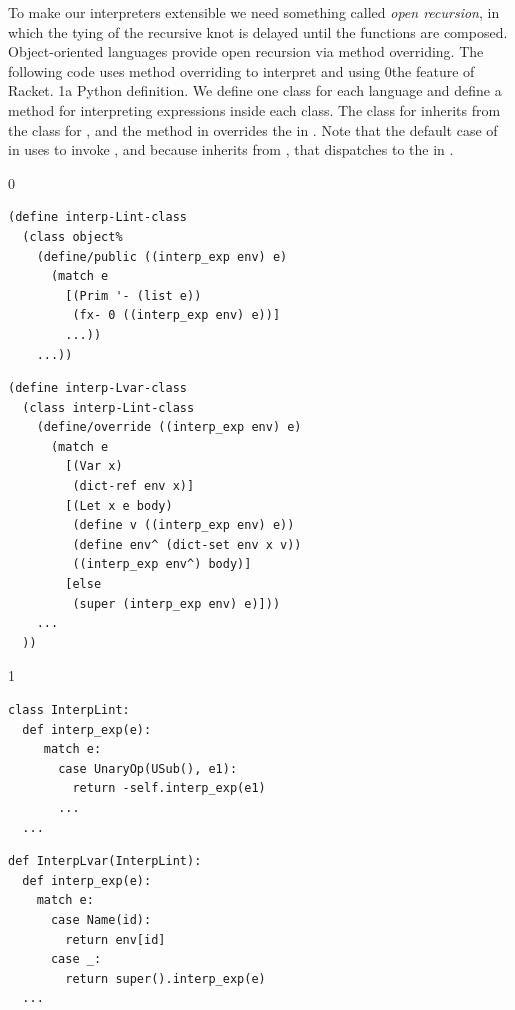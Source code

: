 \documentclass[7x10]{TimesAPriori_MIT}%
\def\racketEd{0}
\def\pythonEd{1}
\def\edition{0}
\newcommand{\racket}[1]{{\if\edition\racketEd{#1}\fi}}
\newcommand{\python}[1]{{\if\edition\pythonEd #1\fi}}
\numberwithin{theorem}{chapter}
\numberwithin{definition}{chapter}
\numberwithin{equation}{chapter}
\begin{document}
To make our interpreters extensible we need something called
\emph{open recursion}, in which the
tying of the recursive knot is delayed until the functions are
composed. Object-oriented languages provide open recursion via method
overriding. The following code uses
method overriding to interpret \LangInt{} and \LangVar{} using
%
\racket{the
  \href{https://docs.racket-lang.org/guide/classes.html}{\code{class}}
  \index{subject}{class} feature of Racket.}
%
\python{a Python  definition.}
%
We define one class for each language and define a method for
interpreting expressions inside each class. The class for \LangVar{}
inherits from the class for \LangInt{}, and the method
 in \LangVar{} overrides the  in
\LangInt{}. Note that the default case of  in
\LangVar{} uses  to invoke , and because
\LangVar{} inherits from \LangInt{}, that dispatches to the
 in \LangInt{}.
\begin{center}
  \hspace{-20pt}
{\if\edition\racketEd  
\begin{minipage}{0.45\textwidth}
\begin{lstlisting}
(define interp-Lint-class
  (class object%
    (define/public ((interp_exp env) e)
      (match e
        [(Prim '- (list e))
         (fx- 0 ((interp_exp env) e))]
        ...))
    ...))
\end{lstlisting}
\end{minipage}
\begin{minipage}{0.45\textwidth}
  \begin{lstlisting}
(define interp-Lvar-class
  (class interp-Lint-class
    (define/override ((interp_exp env) e)
      (match e
        [(Var x)
         (dict-ref env x)]
        [(Let x e body)
         (define v ((interp_exp env) e))
         (define env^ (dict-set env x v))
         ((interp_exp env^) body)]
        [else
         (super (interp_exp env) e)]))
    ...
  ))
\end{lstlisting}
\end{minipage}
\fi}
{\if\edition\pythonEd
\begin{minipage}{0.45\textwidth}
\begin{lstlisting}
class InterpLint:
  def interp_exp(e):
     match e:
       case UnaryOp(USub(), e1):
         return -self.interp_exp(e1)
       ...
  ...
\end{lstlisting}
\end{minipage}
\begin{minipage}{0.45\textwidth}
  \begin{lstlisting}
def InterpLvar(InterpLint):
  def interp_exp(e):
    match e:
      case Name(id):
        return env[id]
      case _:
        return super().interp_exp(e)
  ...
\end{lstlisting}
\end{minipage}
\fi}
\end{center}
\end{document}
